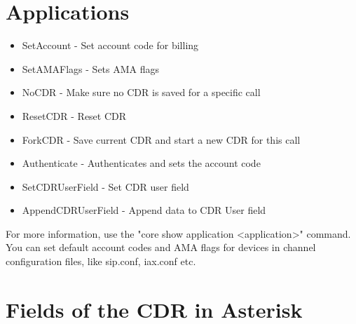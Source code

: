 \section{Applications}

\begin{itemize}
    \item SetAccount - 		Set account code for billing
    \item SetAMAFlags -		Sets AMA flags
    \item NoCDR - 		Make sure no CDR is saved for a specific call
    \item ResetCDR -  		Reset CDR
    \item ForkCDR -		Save current CDR and start a new CDR for this call
    \item Authenticate -	Authenticates and sets the account code
    \item SetCDRUserField -  	Set CDR user field
    \item AppendCDRUserField - 	Append data to CDR User field 
\end{itemize}

For more information, use the "core show application <application>" command.
You can set default account codes and AMA flags for devices in 
channel configuration files, like sip.conf, iax.conf etc.


\section{Fields of the CDR in Asterisk}

